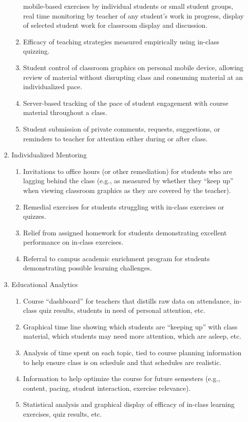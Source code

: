 \documentclass{article}
\begin{document}
\begin{enumerate}
\begin{enumerate}
    mobile-based exercises by individual students or small student groups,
    real time monitoring by teacher of any student's work in progress,
    display of selected student work for classroom display and discussion.
  \item Efficacy of teaching strategies measured empirically using in-class quizzing.
  \item Student control of classroom graphics on personal mobile device,
    allowing review of material without disrupting class and
    consuming material at an individualized pace.
  \item Server-based tracking of the pace of student engagement with course material
    throughout a class.
  \item Student submission of private comments, requests, suggestions, or reminders to
    teacher for attention either during or after class.
  \end{enumerate}
\item{Individualized Mentoring}
  \begin{enumerate}
  \item Invitations to office hours (or other remediation) for students who are lagging
    behind the class (e.g., as measured by whether they ``keep up'' when viewing classroom
    graphics as they are covered by the teacher).
  \item Remedial exercises for students struggling with in-class exercises or quizzes.
  \item Relief from assigned homework for students demonstrating excellent performance on
    in-class exercises.
  \item Referral to campus academic enrichment program for students demonstrating possible
    learning challenges.
  \end{enumerate}
\item{Educational Analytics}
  \begin{enumerate}
  \item Course ``dashboard'' for teachers that distills raw data on attendance, in-class
    quiz results, students in need of personal attention, etc.
  \item Graphical time line showing which students are ``keeping up'' with class
    material, which students may need more attention, which are asleep, etc.
  \item Analysis of time spent on each topic, tied to course planning information to help
    ensure class is on schedule and that schedules are realistic.
  \item Information to help optimize the course for future semesters
    (e.g., content, pacing, student interaction, exercise relevance).
  \item Statistical analysis and graphical display of efficacy of in-class learning
    exercises, quiz results, etc.
  \end{enumerate}
\end{enumerate}
\end{document}
